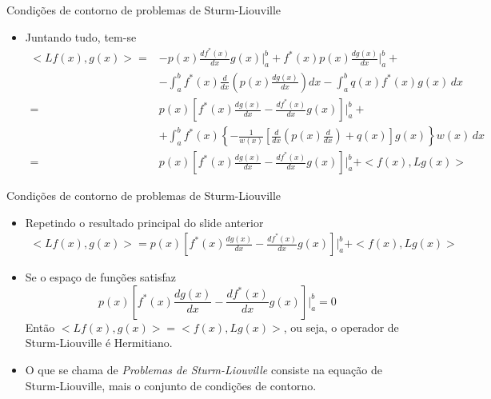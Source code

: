       \begin{slide}[toc=]{Condições de contorno de problemas de Sturm-Liouville}
		\begin{itemize}
			\item Juntando tudo, tem-se
				\begin{align*}
					<Lf(x),g(x)> =& - p(x)\frac{df^\ast(x)}{dx}g(x)\Big \vert_a^b+f^\ast (x)p(x)\frac{dg(x)}{dx}\Big \vert_a^b +\\
					              &- \int_a^bf^\ast (x)\frac{d}{dx}\left (p(x)\frac{dg(x)}{dx}\right ) dx-\int_a^b q(x) f^\ast(x)g(x)\,dx\\
						      =&  p(x)\left [ f^\ast (x)\frac{dg(x)}{dx}-\frac{df^\ast(x)}{dx}g(x)\right ]\Bigg \vert_a^b + \\
						       &+\int_a^bf^\ast (x)\left \{-\frac{1}{w(x)} \left [\frac{d}{dx}\left (p(x)\frac{d}{dx}\right ) + q(x)\right ]g(x)\right \} w(x)\,dx\\
						      =&p(x)\left [ f^\ast (x)\frac{dg(x)}{dx}-\frac{df^\ast(x)}{dx}g(x)\right ]\Bigg \vert_a^b + <f(x),Lg(x)>
				\end{align*}
%
		\end{itemize}
      \end{slide}      
      
      \begin{slide}[toc=]{Condições de contorno de problemas de Sturm-Liouville}
		\begin{itemize}
			\item Repetindo o resultado principal do slide anterior
				\begin{align*}
					<Lf(x),g(x)> =p(x)\left [ f^\ast (x)\frac{dg(x)}{dx}-\frac{df^\ast(x)}{dx}g(x)\right ]\Bigg \vert_a^b + <f(x),Lg(x)>
				\end{align*}
			\item Se o espaço de funções satisfaz
				\begin{equation*}
					p(x)\left [ f^\ast (x)\frac{dg(x)}{dx}-\frac{df^\ast(x)}{dx}g(x)\right ]\Bigg \vert_a^b = 0
				\end{equation*}
				Então $<Lf(x),g(x)> = <f(x),Lg(x)>$, ou seja, o operador de Sturm-Liouville é Hermitiano.
			\item O que se chama de \emph{Problemas de Sturm-Liouville} consiste na equação de Sturm-Liouville, mais o conjunto de condições de contorno.

		\end{itemize}
      \end{slide}
   
